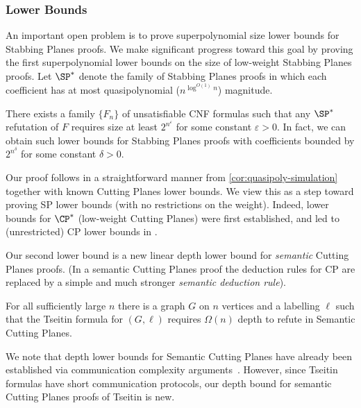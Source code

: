\documentclass{toc}
\begin{document}
\subsubsection{Lower Bounds} 
An important open problem is to prove superpolynomial size lower bounds for Stabbing Planes proofs.
We make significant progress toward this goal by proving the first superpolynomial lower bounds
on the size of low-weight Stabbing Planes proofs.
Let $\SP^*$ denote the family of Stabbing Planes proofs in which each coefficient has at most quasipolynomial ($n^{\log^{O(1)} n}$) magnitude.
%

\begin{theorem}\label{thm:spstar-lb}
There exists a family %
%
$\{F_n\}$ of unsatisfiable CNF formulas  %
such that any $\SP^*$ refutation of $F$ requires size at least $2^{n^\varepsilon}$ for
some %
constant $\varepsilon > 0$. In fact, we can obtain such lower bounds for Stabbing Planes proofs with coefficients bounded by $2^{n^\delta}$ for some constant $\delta>0$.
\end{theorem}

Our proof follows in a straightforward manner from \autoref{cor:quasipoly-simulation} together with known Cutting Planes lower bounds.
We view this as a step toward proving SP lower bounds (with no restrictions on the weight).
Indeed, lower bounds for $\CP^*$ (low-weight Cutting Planes) \cite{BonetPR97} were first established, and led to (unrestricted) CP lower bounds
in %
\cite{Pudlak97}. 


Our second lower bound is a new linear depth lower bound for \emph{semantic}
Cutting Planes proofs.
(In a semantic Cutting Planes proof the deduction rules for CP are replaced by
a simple and much stronger \emph{semantic deduction rule}).
%
%

\begin{theorem}
\label{depth-lb}
   For all sufficiently large $n$ there is a graph $G$ on $n$ vertices and a labelling $\ell$ such that the Tseitin formula for $(G, \ell)$ requires $\Omega(n)$ depth to refute in Semantic Cutting Planes.
\end{theorem}


%
We note that depth lower bounds for Semantic Cutting Planes have already
been  %
established  %
%
via communication complexity arguments~\cite{ipu:cp}.  %
However, since Tseitin formulas have short communication protocols,
our depth bound for semantic Cutting Planes proofs of Tseitin is new.
%
%
\end{document}
